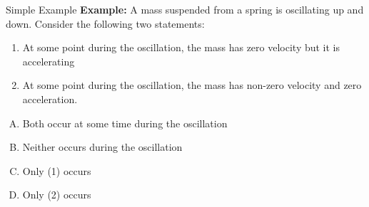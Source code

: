 \documentclass[12pt,compress,aspectratio=169]{beamer}
\begin{document}
%
%
%    
%    



\begin{frame}{Simple Example}
  \textbf{Example:} A mass suspended from a spring is oscillating up and
  down. Consider the following two statements:
  \begin{enumerate}
  \item At some point during the oscillation, the mass has zero velocity but it
    is accelerating
  \item At some point during the oscillation, the mass has non-zero velocity and
    zero acceleration.
  \end{enumerate}
  \begin{enumerate}[(A)]
  \item Both occur at some time during the oscillation
  \item Neither occurs during the oscillation
  \item Only (1) occurs
  \item Only (2) occurs
  \end{enumerate}
\end{frame}
\end{document}
